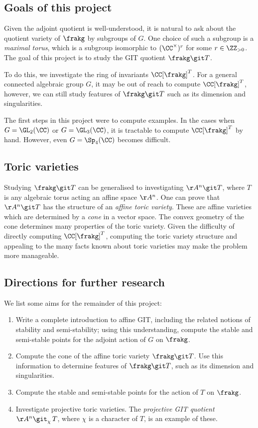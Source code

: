 \subsection{Goals of this project}
Given the adjoint quotient is well-understood, it is natural to ask about the quotient variety of $\frakg$ by subgroups of $G$.
One choice of such a subgroup is a \emph{maximal torus}, which is a subgroup isomorphic to $(\CC^\times)^r$ for some $r \in \ZZ_{> 0}$.
The goal of this project is to study the GIT quotient $\frakg \git T$.

To do this, we investigate the ring of invariants $\CC[\frakg]^T$.
For a general connected algebraic group $G$, it may be out of reach to compute $\CC[\frakg]^T$, however, we can still study features of $\frakg \git T$ such as its dimension and singularities.

The first steps in this project were to compute examples.
In the cases when $G = \GL_2(\CC)$ or $G = \GL_3(\CC)$, it is tractable to compute $\CC[\frakg]^T$ by hand.
However, even $G = \Sp_4(\CC)$ becomes difficult.

\subsection{Toric varieties}
Studying $\frakg \git T$ can be generalised to investigating $\AA^n \git T$, where $T$ is any algebraic torus acting an affine space $\AA^n$.
One can prove that $\AA^n \git T$ has the structure of an \emph{affine toric variety}.
These are affine varieties which are determined by a \emph{cone} in a vector space.
The convex geometry of the cone determines many properties of the toric variety.
Given the difficulty of directly computing $\CC[\frakg]^T$, computing the toric variety structure and appealing to the many facts known about toric varieties may make the problem more manageable.

\subsection{Directions for further research}
We list some aims for the remainder of this project:
\begin{enumerate}
\item
Write a complete introduction to affine GIT, including the related notions of stability and semi-stability;
using this understanding, compute the stable and semi-stable points for the adjoint action of $G$ on $\frakg$.

\item
Compute the cone of the affine toric variety $\frakg \git T$.
Use this information to determine features of $\frakg \git T$, such as its dimension and singularities.

\item
Compute the stable and semi-stable points for the action of $T$ on $\frakg$.

\item
Investigate projective toric varieties.
The \emph{projective GIT quotient} $\AA^n \git_\chi \, T$, where $\chi$ is a character of $T$, is an example of these.
\end{enumerate}

